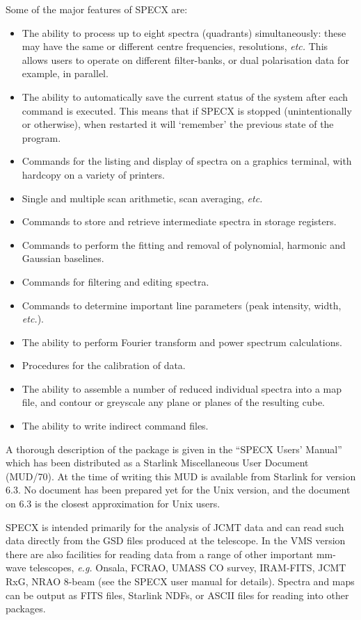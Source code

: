\documentclass[twoside,11pt]{article}
\newcommand{\xref}[3]{#1}
\renewcommand{\_}{\texttt{\symbol{95}}}
\begin{document}
Some of the major features of SPECX are:
\begin{itemize}
\item
The ability to process up to eight spectra (quadrants) simultaneously:
these may have the same or different centre frequencies, resolutions, 
\emph{etc.} This allows users to operate on different filter-banks, or
dual polarisation data for example, in parallel. 
\item
The ability to automatically save the current status of the system 
after each command is executed. This means that if SPECX is
stopped (unintentionally or otherwise), when restarted it will
`remember' the previous state of the program.
\item
Commands for the listing and display of spectra on a graphics
terminal, with hardcopy on a variety of printers.
\item
Single and multiple scan arithmetic, scan averaging, \emph{etc.}
\item
Commands to store and retrieve intermediate spectra in storage registers.
\item
Commands to perform the fitting and removal of polynomial, 
harmonic and Gaussian baselines.
\item
Commands for filtering and editing spectra.
\item
Commands to determine important line parameters (peak intensity, width, 
\emph{etc.}).
\item
The ability to perform Fourier transform and power spectrum calculations.
\item
Procedures for the calibration of data.
\item
The ability to assemble a number of reduced individual spectra into a 
map file, and contour or greyscale any plane or planes of the resulting cube.
\item
The ability to write indirect command files.
\end{itemize}

A thorough description of the package is given in the ``SPECX Users' Manual''
which has been distributed as a Starlink Miscellaneous User Document
(MUD/70). At the time of writing this MUD is available from Starlink for
version 6.3. No document has been prepared yet for the Unix
version, and the document on 6.3 is the closest approximation for Unix
users.

SPECX is intended primarily for the analysis of JCMT data and can read such
data directly from the \xref{GSD}{sun229}{} files produced at the telescope.  In the VMS
version there are also facilities for reading data from a range of other
important mm-wave telescopes, {\em e.g.} Onsala, FCRAO, UMASS CO survey,
IRAM-FITS, JCMT RxG, NRAO 8-beam (see the SPECX user manual for details).
Spectra and maps can be output as FITS files, Starlink NDFs, or ASCII files
for reading into other packages.
\end{document}
